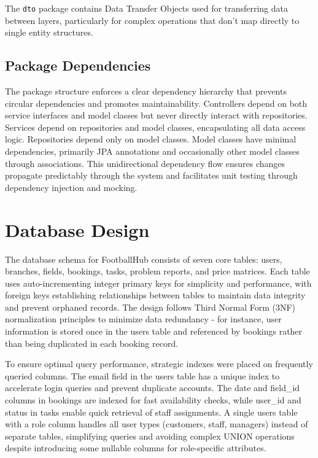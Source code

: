 The \texttt{dto} package contains Data Transfer Objects used for transferring data between layers, particularly for complex operations that don't map directly to single entity structures.

\subsection{Package Dependencies}

The package structure enforces a clear dependency hierarchy that prevents circular dependencies and promotes maintainability. Controllers depend on both service interfaces and model classes but never directly interact with repositories. Services depend on repositories and model classes, encapsulating all data access logic. Repositories depend only on model classes. Model classes have minimal dependencies, primarily JPA annotations and occasionally other model classes through associations. This unidirectional dependency flow ensures changes propagate predictably through the system and facilitates unit testing through dependency injection and mocking.

\section{Database Design}

The database schema for FootballHub consists of seven core tables: users, branches, fields, bookings, tasks, problem reports, and price matrices. Each table uses auto-incrementing integer primary keys for simplicity and performance, with foreign keys establishing relationships between tables to maintain data integrity and prevent orphaned records. The design follows Third Normal Form (3NF) normalization principles to minimize data redundancy - for instance, user information is stored once in the users table and referenced by bookings rather than being duplicated in each booking record.

To ensure optimal query performance, strategic indexes were placed on frequently queried columns. The email field in the users table has a unique index to accelerate login queries and prevent duplicate accounts. The date and field\_id columns in bookings are indexed for fast availability checks, while user\_id and status in tasks enable quick retrieval of staff assignments. A single users table with a role column handles all user types (customers, staff, managers) instead of separate tables, simplifying queries and avoiding complex UNION operations despite introducing some nullable columns for role-specific attributes.

